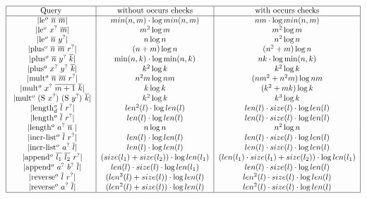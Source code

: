 \begin{figure}[t]
    \[
      \begin{tabular}{|c|c|c|}
           \hline
           Query & without occurs checks & with occurs checks \\
           \hline
           \lstinline|le$^o$ $\overline{n}$ $\overline{m}$| & 
           $min(n, m) \cdot \log min (n, m)$ & $nm \cdot \log min (n, m)$ \\
           \lstinline|le$^o$ $x^?$ $\overline{m}$| & $m^2 \log m$ & $m^2 \log m$  \\
           \lstinline|le$^o$ $\overline{n}$ $y^?$| & $n \log n$ & $n^2 \log n$  \\
           \lstinline|plus$^o$ $\overline{n}$ $\overline{m}$ $r^?$| & $(n + m) \log n$ & $(n^2 + m) \log n$ \\
           \lstinline|plus$^o$ $\overline{n}$ $y^?$ $\overline{k}$| & $\min(n, k) \cdot \log \min(n, k)$ & $nk \cdot \log \min(n, k)$ \\
           \lstinline|plus$^o$ $x^?$ $y^?$ $\overline{k}$| & $k^2 \log k$ & $k^2 \log k$  \\
           \lstinline|mult$^o$ $\overline{n}$ $\overline{m}$ $r^?$| & $n^2 m \log n m$ & $(n m^2 + n^2 m) \log n m$  \\
           \lstinline|mult$^o$ $x^?$ $\overline{m + 1}$ $\overline{k}$| & $k \log k$ & $(k^2 + mk) \log k$ \\
           \lstinline|mult$^o$ (S $ x^?$) (S $y^?$) $\overline{k}$| & $k^2 \log k$ & $k^3 \log k$ \\
           \lstinline|length$_d^o$ $\overline{l}$ $r^?$| & $len^2(l) \cdot \log len(l)$ & $len(l) \cdot size(l) \cdot \log len(l)$ \\
           \lstinline|length$^o$ $\overline{l}$ $r^?$| & $len(l) \cdot \log len(l)$ & $len(l) \cdot size(l) \cdot \log len(l)$ \\
           \lstinline|length$^o$ $a^?$ $\overline{n}$ | & $n \log n$ & $n^2 \log n$  \\
           \lstinline|incr-list$^o$ $\overline{l}$ $r^?$| & $len(l) \cdot \log len(l)$ & $len(l) \cdot size(l) \cdot \log len(l)$ \\
           \lstinline|incr-list$^o$ $a^?$ $\overline{l}$| & $len(l) \cdot \log len(l)$ & $len(l) \cdot size(l) \cdot \log len(l)$ \\
           \lstinline|append$^o$ $\overline{l_1}$ $\overline{l_2}$ $r^?$| & $(size(l_1) + size(l_2)) \cdot \log len(l_1)$ & $(len(l_1) \cdot size(l_1) + size(l_2)) \cdot \log len(l_1)$  \\
           \lstinline|append$^o$ $a^?$ $b^?$ $\overline{l}$| & $len(l) \cdot size(l) \cdot  \log len(l_1)$ & $len(l) \cdot size(l) \cdot  \log len(l)$  \\
           \lstinline|reverse$^o$ $\overline{l}$ $r^?$| & $(len^3(l) + size(l)) \cdot \log len(l)$ & $len^2(l) \cdot size(l) \cdot \log len(l)$ \\
           \lstinline|reverse$^o$ $a^?$ $\overline{l}$| & $(len^2(l) + size(l)) \cdot \log len(l)$ & $len^2(l) \cdot size(l) \cdot \log len(l)$ \\
           \hline
            

\end{tabular}\]
\end{figure}
